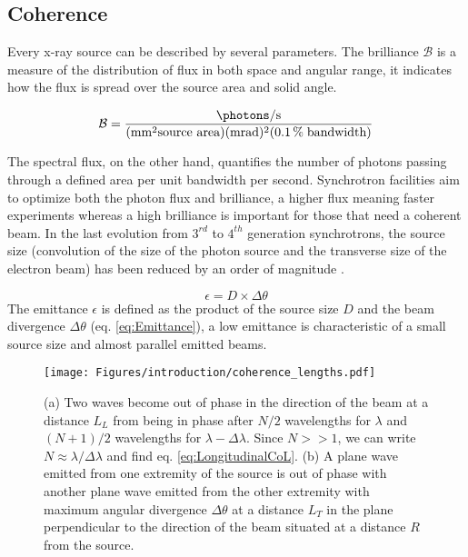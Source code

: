 \subsection{Coherence} \label{sec:Coherence}

Every x-ray source can be described by several parameters.
The brilliance $\mathcal{B}$ is a measure of the distribution of flux in both space and angular range, it indicates how the flux is spread over the source area and solid angle.

\begin{equation}
    \mathcal{B} = \frac{\unit{\photons \per \second}}{(\unit{\mm^2} \text{source area})(\unit{\milli\radian})^2(\qty{0.1}{\percent} \; \text{bandwidth})}
\end{equation}

The spectral flux, on the other hand, quantifies the number of photons passing through a defined area per unit bandwidth per second.
Synchrotron facilities aim to optimize both the photon flux and brilliance, a higher flux meaning faster experiments whereas a high brilliance is important for those that need a coherent beam.
In the last evolution from $3^{rd}$ to $4^{th}$ generation synchrotrons, the source size (convolution of the size of the photon source and the transverse size of the electron beam) has been reduced by an order of magnitude \parencite{Willmott}.

\begin{equation}
    \label{eq:Emittance}
    \epsilon = D \times \Delta\theta
\end{equation}
The emittance $\epsilon$ is defined as the product of the source size $D$ and the beam divergence $\Delta\theta$ (eq. \ref{eq:Emittance}), a low emittance is characteristic of a small source size and almost parallel emitted beams.

\begin{figure}[!htb]
    \centering
    \texttt{[image: Figures/introduction/coherence\_lengths.pdf]}
    \caption{
    (a) Two waves become out of phase in the direction of the beam at a distance $L_L$ from being in phase after $N/2$ wavelengths for $\lambda$ and $(N+1)/2$ wavelengths for $\lambda - \Delta\lambda$. Since $N >> 1$, we can write $N\approx\lambda/\Delta\lambda$ and find eq. \ref{eq:LongitudinalCoL}.
    (b) A plane wave emitted from one extremity of the source is out of phase with another plane wave emitted from the other extremity with maximum angular divergence $\Delta\theta$ at a distance $L_T$ in the plane perpendicular to the direction of the beam situated at a distance $R$ from the source.
    }
    \label{fig:CoherenceLengths}
\end{figure}


